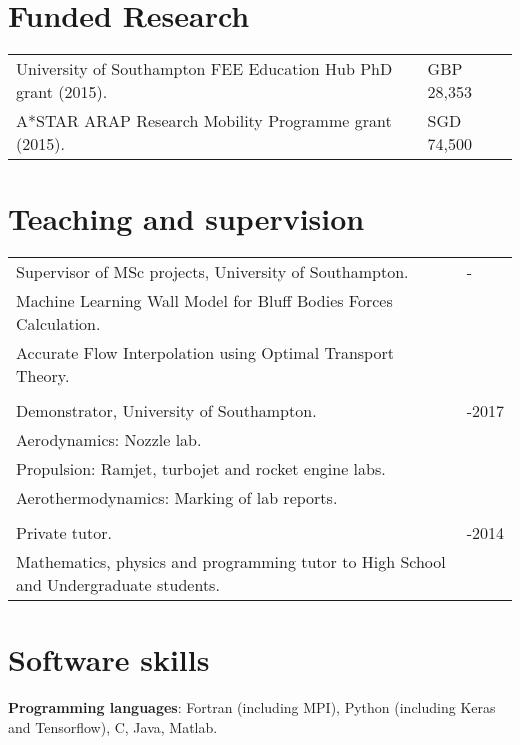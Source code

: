 \documentclass[line]{res}
\newenvironment{p}
  {\begin{adjustwidth}{-10pt}{0pt}}
  {\end{adjustwidth}}
\newenvironment{p1}
  {\begin{adjustwidth}{-16pt}{0pt}
  \vspace{1pt}}
  {\end{adjustwidth}}
\newenvironment{p3}
  {\begin{adjustwidth}{-16pt}{0pt}
  \vspace{3pt}}
  {\end{adjustwidth}}
\begin{document}
\begin{resume}
\section{Funded Research}\vspace{0.5cm}
\begin{p3}
\begin{tabular}{p{} >{\raggedleft\arraybackslash}p{}}
University of Southampton FEE Education Hub PhD grant (2015). & GBP 28,353\\
A*STAR ARAP Research Mobility Programme grant (2015). & SGD 74,500
\end{tabular}
\end{p3}

\section{Teaching and supervision}\vspace{0.5cm}
\begin{p1}
\begin{tabular}{p{} >{\raggedleft\arraybackslash}p{}}
Supervisor of MSc projects, University of Southampton. & 2019-\\ 
\textnormal{ Machine Learning Wall Model for Bluff Bodies Forces
Calculation.} &\\
\textnormal{ Accurate Flow Interpolation using Optimal Transport Theory.} &\\
\\
Demonstrator, University of Southampton. & 2015-2017\\ 
\textnormal{ Aerodynamics:} Nozzle lab. &\\
\textnormal{ Propulsion}: Ramjet, turbojet and rocket engine labs. &\\
\textnormal{ Aerothermodynamics}: Marking of lab reports. & \\
\\
Private tutor. & 2011-2014\\ 
\textnormal{ Mathematics, physics and programming tutor to High School and Undergraduate students.}&
\end{tabular}
\end{p1}

\section{Software skills}\vspace{0.5cm}
\begin{p}\setlength{\parskip}{3pt}
\textbf{Programming languages}: Fortran (including MPI), Python (including Keras and Tensorflow), C, Java, Matlab.


\end{p}
\end{resume}
\end{document}
